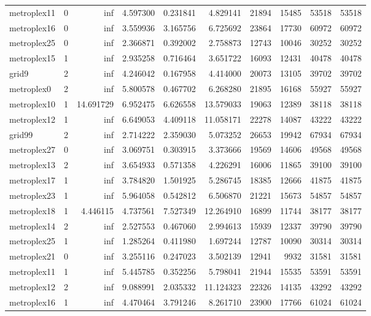 \begin{longtable}{|l|r|r|r|r|r|r|r|r|r|}
metroplex11 & 0 & inf & 4.597300 & 0.231841 & 4.829141 & 21894 & 15485 & 53518 & 53518 \\
metroplex16 & 0 & inf & 3.559936 & 3.165756 & 6.725692 & 23864 & 17730 & 60972 & 60972 \\
metroplex25 & 0 & inf & 2.366871 & 0.392002 & 2.758873 & 12743 & 10046 & 30252 & 30252 \\
metroplex15 & 1 & inf & 2.935258 & 0.716464 & 3.651722 & 16093 & 12431 & 40478 & 40478 \\
grid9 & 2 & inf & 4.246042 & 0.167958 & 4.414000 & 20073 & 13105 & 39702 & 39702 \\
metroplex0 & 2 & inf & 5.800578 & 0.467702 & 6.268280 & 21895 & 16168 & 55927 & 55927 \\
metroplex10 & 1 & 14.691729 & 6.952475 & 6.626558 & 13.579033 & 19063 & 12389 & 38118 & 38118 \\
metroplex12 & 1 & inf & 6.649053 & 4.409118 & 11.058171 & 22278 & 14087 & 43222 & 43222 \\
grid99 & 2 & inf & 2.714222 & 2.359030 & 5.073252 & 26653 & 19942 & 67934 & 67934 \\
metroplex27 & 0 & inf & 3.069751 & 0.303915 & 3.373666 & 19569 & 14606 & 49568 & 49568 \\
metroplex13 & 2 & inf & 3.654933 & 0.571358 & 4.226291 & 16006 & 11865 & 39100 & 39100 \\
metroplex17 & 1 & inf & 3.784820 & 1.501925 & 5.286745 & 18385 & 12666 & 41875 & 41875 \\
metroplex23 & 1 & inf & 5.964058 & 0.542812 & 6.506870 & 21221 & 15673 & 54857 & 54857 \\
metroplex18 & 1 & 4.446115 & 4.737561 & 7.527349 & 12.264910 & 16899 & 11744 & 38177 & 38177 \\
metroplex14 & 2 & inf & 2.527553 & 0.467060 & 2.994613 & 15939 & 12337 & 39790 & 39790 \\
metroplex25 & 1 & inf & 1.285264 & 0.411980 & 1.697244 & 12787 & 10090 & 30314 & 30314 \\
metroplex21 & 0 & inf & 3.255116 & 0.247023 & 3.502139 & 12941 & 9932 & 31581 & 31581 \\
metroplex11 & 1 & inf & 5.445785 & 0.352256 & 5.798041 & 21944 & 15535 & 53591 & 53591 \\
metroplex12 & 2 & inf & 9.088991 & 2.035332 & 11.124323 & 22326 & 14135 & 43292 & 43292 \\
metroplex16 & 1 & inf & 4.470464 & 3.791246 & 8.261710 & 23900 & 17766 & 61024 & 61024 \\

\end{longtable}
